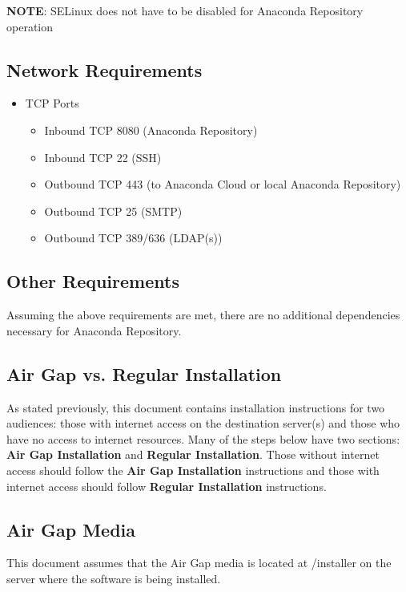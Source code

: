 \documentclass[letterpaper,10pt,openany,oneside]{sphinxmanual}
\begin{document}
\textbf{NOTE}: SELinux does not have to be disabled for Anaconda Repository
operation


\subsection{Network Requirements}
\label{AnacondaRepository:network-requirements}\begin{itemize}
\item {} 
TCP Ports
\begin{itemize}
\item {} 
Inbound TCP 8080 (Anaconda Repository)

\item {} 
Inbound TCP 22 (SSH)

\item {} 
Outbound TCP 443 (to Anaconda Cloud or local Anaconda Repository)

\item {} 
Outbound TCP 25 (SMTP)

\item {} 
Outbound TCP 389/636 (LDAP(s))

\end{itemize}

\end{itemize}


\subsection{Other Requirements}
\label{AnacondaRepository:other-requirements}
Assuming the above requirements are met, there are no additional
dependencies necessary for Anaconda Repository.


\subsection{Air Gap vs. Regular Installation}
\label{AnacondaRepository:air-gap-vs-regular-installation}
As stated previously, this document contains installation instructions
for two audiences: those with internet access on the destination
server(s) and those who have no access to internet resources. Many of
the steps below have two sections: \textbf{Air Gap Installation} and
\textbf{Regular Installation}. Those without internet access should follow
the \textbf{Air Gap Installation} instructions and those with internet access
should follow \textbf{Regular Installation} instructions.


\subsection{Air Gap Media}
\label{AnacondaRepository:air-gap-media}
This document assumes that the Air Gap media is located at /installer on
the server where the software is being installed.
\end{document}
